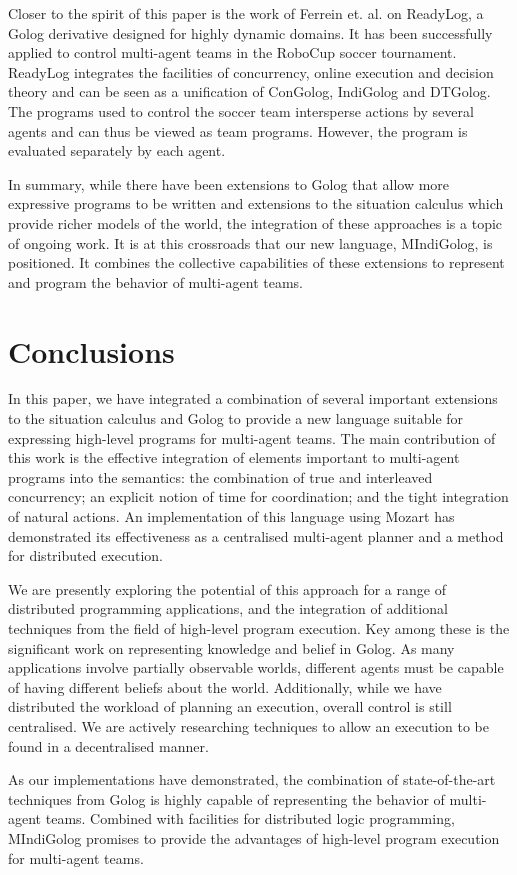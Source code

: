 \documentclass[letterpaper]{article}
\begin{document}
Closer to the spirit of this paper is the work of Ferrein et. al.
\cite{Ferrein2005readylog} on ReadyLog, a Golog derivative designed
for highly dynamic domains. It has been successfully applied to control
multi-agent teams in the RoboCup soccer tournament. ReadyLog integrates
the facilities of concurrency, online execution and decision theory
and can be seen as a unification of ConGolog, IndiGolog and DTGolog.
The programs used to control the soccer team intersperse actions by
several agents and can thus be viewed as team programs. However, the
program is evaluated separately by each agent.

In summary, while there have been extensions to Golog that allow more
expressive programs to be written and extensions to the situation
calculus which provide richer models of the world, the integration
of these approaches is a topic of ongoing work. It is at this crossroads
that our new language, MIndiGolog, is positioned. It combines the
collective capabilities of these extensions to represent and program
the behavior of multi-agent teams.


\section{Conclusions}

\label{sec:Conclusions-and-Future}

In this paper, we have integrated a combination of several important
extensions to the situation calculus and Golog to provide a new language
suitable for expressing high-level programs for multi-agent teams.
The main contribution of this work is the effective integration of
elements important to multi-agent programs into the semantics: the
combination of true and interleaved concurrency; an explicit notion
of time for coordination; and the tight integration of natural actions.
An implementation of this language using Mozart has demonstrated its
effectiveness as a centralised multi-agent planner and a method for
distributed execution. 

We are presently exploring the potential of this approach for a range
of distributed programming applications, and the integration of additional
techniques from the field of high-level program execution. Key among
these is the significant work on representing knowledge and belief
in Golog. As many applications involve partially observable worlds,
different agents must be capable of having different beliefs about
the world. Additionally, while we have distributed the workload of
planning an execution, overall control is still centralised. We are
actively researching techniques to allow an execution to be found
in a decentralised manner.

As our implementations have demonstrated, the combination of state-of-the-art
techniques from Golog is highly capable of representing the behavior
of multi-agent teams. Combined with facilities for distributed logic
programming, MIndiGolog promises to provide the advantages of high-level
program execution for multi-agent teams.



\end{document}
